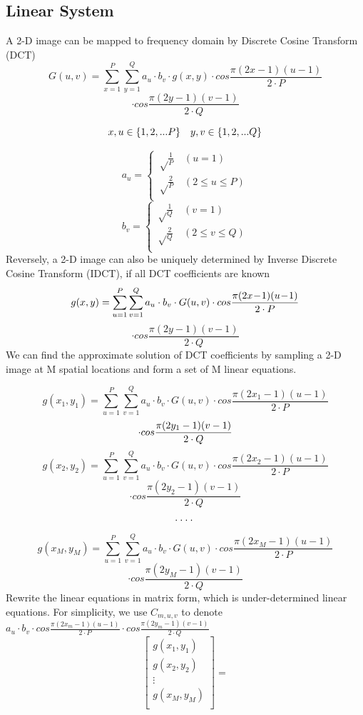 \documentclass{article}
\begin{document}
\subsection{Linear System}
A 2-D image can be mapped to frequency domain by Discrete Cosine Transform (DCT)
$$
G(u,v)=
\sum^P_{x=1}\sum^Q_{y=1}a_u \cdot b_v \cdot g(x,y) \cdot cos \frac{\pi(2x \!-\! 1)(u\!-\!1)}{2 \cdot P}
$$
$$
\cdot cos \frac{\pi (2y \!-\! 1)(v\!-\!1)}{2 \cdot Q}
$$

$$
x,u \in \{1,2,...P\}\quad
y,v \in \{1,2,...Q\}\\
$$

$$
a_u=\left\{
\begin{aligned}
\sqrt \frac{1}{P} &\ (u=1)\\
\sqrt \frac{2}{P} &\ (2 \leq u \leq P)\\
\end{aligned}
\right.
$$
$$
b_v=\left\{
\begin{aligned}
\sqrt \frac{1}{Q} &\ (v=1)\\
\sqrt \frac{2}{Q} &\ (2 \leq v \leq Q)\\
\end{aligned}
\right.
$$
Reversely, a 2-D image can also be uniquely determined by Inverse Discrete Cosine Transform (IDCT), if all DCT coefficients are known
$$
g(x,y)=
\sum^P_{u=1}\sum^Q_{v=1}a_u \cdot b_v \cdot G(u,v) \cdot cos \frac{\pi(2x\!-\!1)(u\!-\!1)}{2 \cdot P}\\
$$
$$
\cdot cos \frac{\pi (2y\!-\!1)(v\!-\!1)}{2 \cdot Q}
$$
We can find the approximate solution of DCT coefficients by sampling a 2-D image at M spatial locations and form a set of M linear equations.

$$
g(x_1, y_1) = \sum^P_{u=1}\sum^Q_{v=1}a_u \cdot b_v \cdot G(u,v) \cdot cos \frac{\pi(2x_1-1)(u-1)}{2 \cdot P}
$$
$$
\cdot cos \frac{\pi (2y_1-1)(v-1)}{2 \cdot Q}\\
$$
$$
g(x_2, y_2) = \sum^P_{u=1}\sum^Q_{v=1}a_u \cdot b_v \cdot G(u,v) \cdot cos \frac{\pi(2x_2-1)(u-1)}{2 \cdot P}
$$
$$
\cdot cos \frac{\pi (2y_2-1)(v-1)}{2 \cdot Q}
$$
$$
\cdot \cdot \cdot \cdot\\
$$
$$
g(x_M, y_M) = \sum^P_{u=1}\sum^Q_{v=1}a_u \cdot b_v \cdot G(u,v) \cdot cos \frac{\pi(2x_M-1)(u-1)}{2 \cdot P}
$$
$$
\cdot cos \frac{\pi (2y_M-1)(v-1)}{2 \cdot Q}
$$
Rewrite the linear equations in matrix form, which is under-determined linear equations. For simplicity, we use 
$ C_{m,u,v}$ to denote $ a_u \cdot b_v \cdot cos \frac{\pi(2x_m-1)(u-1)}{2 \cdot P} \cdot cos \frac{\pi (2y_m-1)(v-1)}{2 \cdot Q}$
$$
\begin{bmatrix}
g(x_1,y_1)\\
g(x_2,y_2)\\
\vdots\\
g(x_M,y_M)\\
\end{bmatrix}=
$$
\end{document}
